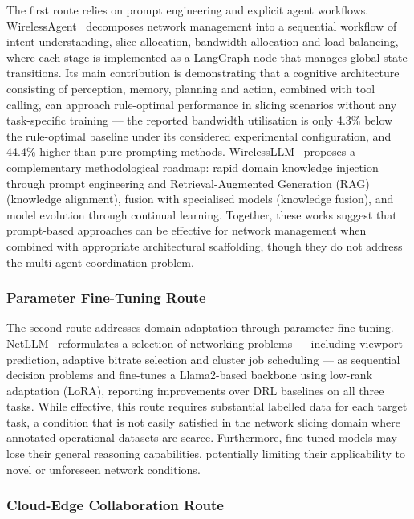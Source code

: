The first route relies on prompt engineering and explicit agent workflows. WirelessAgent~\cite{tong2025wirelessagent} decomposes network management into a sequential workflow of intent understanding, slice allocation, bandwidth allocation and load balancing, where each stage is implemented as a LangGraph node that manages global state transitions. Its main contribution is demonstrating that a cognitive architecture consisting of perception, memory, planning and action, combined with tool calling, can approach rule-optimal performance in slicing scenarios without any task-specific training --- the reported bandwidth utilisation is only 4.3\% below the rule-optimal baseline under its considered experimental configuration, and 44.4\% higher than pure prompting methods. WirelessLLM~\cite{shao2024wirelessllm} proposes a complementary methodological roadmap: rapid domain knowledge injection through prompt engineering and Retrieval-Augmented Generation (RAG)~\cite{lewis2020rag} (knowledge alignment), fusion with specialised models (knowledge fusion), and model evolution through continual learning. Together, these works suggest that prompt-based approaches can be effective for network management when combined with appropriate architectural scaffolding, though they do not address the multi-agent coordination problem.

\subsubsection{Parameter Fine-Tuning Route}

The second route addresses domain adaptation through parameter fine-tuning. NetLLM~\cite{wu2024netllm} reformulates a selection of networking problems --- including viewport prediction, adaptive bitrate selection and cluster job scheduling --- as sequential decision problems and fine-tunes a Llama2-based backbone using low-rank adaptation (LoRA), reporting improvements over DRL baselines on all three tasks. While effective, this route requires substantial labelled data for each target task, a condition that is not easily satisfied in the network slicing domain where annotated operational datasets are scarce. Furthermore, fine-tuned models may lose their general reasoning capabilities, potentially limiting their applicability to novel or unforeseen network conditions.

\subsubsection{Cloud-Edge Collaboration Route}

